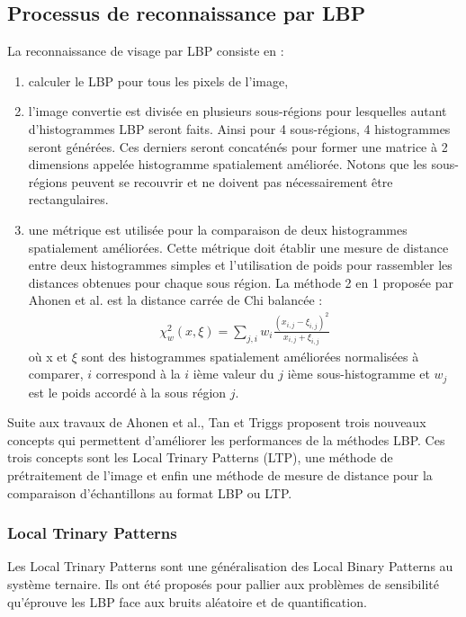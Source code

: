 \subsection{Processus de reconnaissance par LBP}
La reconnaissance de visage par LBP consiste en :
\begin{enumerate}
	\item calculer le LBP pour tous les pixels de l'image,
	\item l'image convertie est divisée en plusieurs sous-régions
pour lesquelles autant d'histogrammes LBP seront faits. Ainsi pour 4 sous-régions, 4
histogrammes seront générées. Ces derniers seront concaténés pour former une matrice à 2 dimensions appelée histogramme spatialement améliorée. Notons que les sous-régions peuvent se recouvrir et ne doivent pas nécessairement être rectangulaires.
	\item une métrique est utilisée pour la comparaison de deux histogrammes spatialement améliorées. Cette métrique doit établir une mesure de distance entre deux histogrammes simples et l'utilisation de poids pour rassembler les distances obtenues pour chaque sous région. La méthode 2 en 1 proposée par Ahonen et al. est la distance carrée de Chi balancée :
\begin{eqnarray}
\chi^2_w(x,\xi)=\sum_{j,i}{w_i\frac{(x_{i,j}-\xi_{i,j})^2}{x_{i,j}+\xi_{i,j}}}
\label{eq20}
\end{eqnarray}où x et $\xi$ sont des histogrammes spatialement améliorées normalisées à comparer, $i$ correspond à la $i$ ième valeur du $j$ ième sous-histogramme et $w_j$ est le poids accordé à la sous région $j$.
\end{enumerate}

Suite aux travaux de Ahonen et al., Tan et Triggs \cite{TAN}proposent trois nouveaux concepts qui permettent d'améliorer les performances de la méthodes LBP. Ces trois concepts sont les Local Trinary Patterns
(LTP), une méthode de prétraitement de l'image et enfin une méthode de mesure de
distance pour la comparaison d'échantillons au format LBP ou LTP.
\subsubsection*{Local Trinary Patterns}
Les Local Trinary Patterns sont une généralisation des  Local Binary Patterns au système ternaire. Ils ont été proposés  \cite{TAN} pour pallier aux problèmes de sensibilité qu'éprouve les LBP face aux bruits aléatoire et de quantification. 

